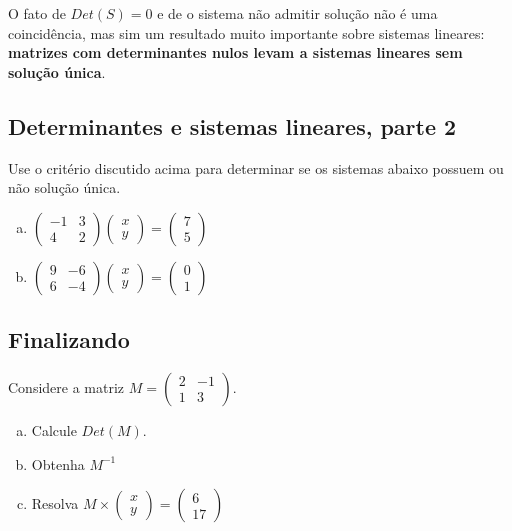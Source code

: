 \documentclass[main_estudante.tex]{subfiles}
\begin{document}
O fato de $Det(S)=0$ e de o sistema não admitir solução não é uma coincidência, mas sim um resultado muito importante sobre sistemas lineares: \textbf{matrizes com determinantes nulos levam a sistemas lineares sem solução única}.

\subsection*{Determinantes e sistemas lineares, parte 2}

\begin{questao}
Use o critério discutido acima para determinar se os sistemas abaixo possuem ou não solução única.
\begin{enumerate}[a)]
\item $\begin{pmatrix}-1 & 3 \\ 4 & 2\end{pmatrix} \begin{pmatrix}x \\ y\end{pmatrix} = \begin{pmatrix}7 \\ 5\end{pmatrix}$
\item $\begin{pmatrix} 9 & -6 \\ 6 & -4\end{pmatrix} \begin{pmatrix}x \\ y\end{pmatrix} = \begin{pmatrix}0 \\ 1\end{pmatrix}$
\end{enumerate}
\end{questao}

\subsection*{Finalizando}

\begin{questao}
Considere a matriz $M=\begin{pmatrix}2 & -1 \\ 1 & 3\end{pmatrix}$.
\begin{enumerate}[a)]
\item Calcule $Det(M)$.
\item Obtenha $M^{-1}$
\item Resolva $M \times \begin{pmatrix}x \\ y\end{pmatrix} = \begin{pmatrix}6 \\ 17\end{pmatrix}$
\end{enumerate}
\end{questao}
\end{document}
